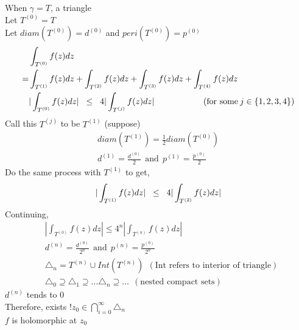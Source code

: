 \documentclass{article}
\begin{document}
\begin{flushleft}
When $\gamma=T$, a triangle\\
Let $T^{(0)}=T$\\
Let $diam(T^{(0)})=d^{(0)}$ and $peri(T^{(0)})=p^{(0)}$
\begin{equation*}
\begin{split}
&\int_{T^{(0)}}^{} f(z) dz \\
=&\int_{T^{(1)}}^{} f(z) dz + \int_{T^{(2)}}^{} f(z) dz + \int_{T^{(3)}}^{} f(z) dz + \int_{T^{(4)}}^{} f(z) dz \\
&|\int_{T^{(0)}}^{} f(z) dz| \hspace{2mm}\leq \hspace{2mm} 4|\int_{T^{(j)}}^{} f(z) dz| \:\:\:\:\:\:\:\:\:\:\:\:\:\:\:\:\:\:\:\:\:\:\:\:\:\:(\text{for some}\: j\in \{1,2,3,4\})
\end{split}
\end{equation*}
Call this $T^{(j)}$ to be $T^{(1)}$ (suppose)
\begin{equation*}
\begin{split} 
diam(T^{(1)})=\frac{1}{2}diam(T^{(0)}) \\
d^{(1)}=\frac{d^{(0)}}{2}\:\: \text{and}\:\: p^{(1)}=\frac{p^{(0)}}{2}
\end{split}
\end{equation*}
Do the same process with $T^{(1)}$ to get, 
\begin{equation*} |\int_{T^{(1)}}^{} f(z) dz| \hspace{2mm}\leq \hspace{2mm}4|\int_{T^{(2)}}^{} f(z) dz| \end{equation*}
Continuing, 
\begin{equation*} 
\begin{split}
&|\int_{T^{(0)}}^{} f(z) dz| \leq 4^n|\int_{T^{(n)}}^{} f(z) dz| \\
&d^{(n)}=\frac{d^{(0)}}{2^n}\:\: \text{and}\:\: p^{(n)}=\frac{p^{(0)}}{2^n} \\
&\triangle_n= T^{(n)} \cup Int(T^{(n)}) \:\:(\text{Int refers to interior of triangle}) \\
&\triangle_0\supseteq \triangle_1 \supseteq \dots \triangle_n\supseteq \dots \:\: (\text{nested compact sets})
\end{split}
\end{equation*}
$d^{(n)}$ tends to $0$\\
Therefore, exists $!z_0 \in \bigcap_{i=0}^{\infty} \triangle_n$ \\
$f$ is holomorphic at $z_0$ 
\begin{equation*}

\end{equation*}
\end{flushleft}
\end{document}
